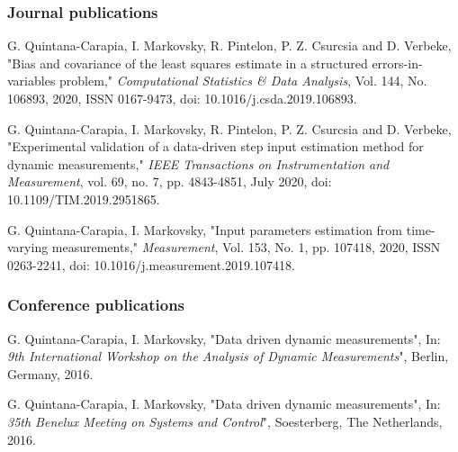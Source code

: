 

\subsubsection*{Journal publications}

\noindent G. Quintana-Carapia, I. Markovsky, R. Pintelon, P. Z. Csurcsia and D. Verbeke, "Bias and covariance of the least squares estimate in a structured errors-in-variables problem," \textit{Computational Statistics & Data Analysis}, Vol. 144, No. 106893, 2020, ISSN 0167-9473, doi: 10.1016/j.csda.2019.106893.


\noindent G. Quintana-Carapia, I. Markovsky, R. Pintelon, P. Z. Csurcsia and D. Verbeke, "Experimental validation of a data-driven step input estimation method for dynamic measurements," \textit{IEEE Transactions on Instrumentation and Measurement}, \color{blue} vol. 69, no. 7, pp. 4843-4851, July 2020, \color{black} doi: 10.1109/TIM.2019.2951865.


\noindent G. Quintana-Carapia, I. Markovsky, "Input parameters estimation from time-varying measurements," \textit{Measurement}, Vol. 153, No. 1, pp. 107418, 2020, ISSN 0263-2241, doi: 10.1016/j.measurement.2019.107418.
 

\vspace{0.1618cm}
\subsubsection*{Conference publications}

\noindent G. Quintana-Carapia, I. Markovsky, "Data driven dynamic measurements",
In: \textit{9th International Workshop on the Analysis of Dynamic Measurements}", Berlin, Germany, 2016.


\noindent G. Quintana-Carapia, I. Markovsky, "Data driven dynamic measurements",
In: \textit{35th Benelux Meeting on Systems and Control}", Soesterberg, The Netherlands, 2016.


